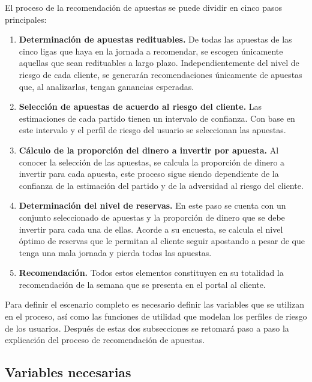  El proceso de la recomendación de apuestas se puede dividir en cinco pasos principales:

 \begin{enumerate}
 	\item \textbf{Determinación de apuestas redituables.} De todas las apuestas de las cinco ligas que haya en la jornada a recomendar, se escogen únicamente aquellas que sean redituables a largo plazo. Independientemente del nivel de riesgo de cada cliente, se generarán recomendaciones únicamente de apuestas que, al analizarlas, tengan ganancias esperadas.
 	\item \textbf{Selección de apuestas de acuerdo al riesgo del cliente.} Las estimaciones de cada partido tienen un intervalo de confianza. Con base en este intervalo y el perfil de riesgo del usuario se seleccionan las apuestas.
 	\item \textbf{Cálculo de la proporción del dinero a invertir por apuesta.} Al conocer la selección de las apuestas, se calcula la proporción de dinero a invertir para cada apuesta, este proceso sigue siendo dependiente de la confianza de la estimación del partido y de la adversidad al riesgo del cliente.
 	\item \textbf{Determinación del nivel de reservas.} En este paso se cuenta con un conjunto seleccionado de apuestas y la proporción de dinero que se debe invertir para cada una de ellas. Acorde a su encuesta, se calcula el nivel óptimo de reservas que le permitan al cliente seguir apostando a pesar de que tenga una mala jornada y pierda todas las apuestas.
 	\item \textbf{Recomendación.} Todos estos elementos constituyen en su totalidad la recomendación de la semana que se presenta en el portal al cliente.
 \end{enumerate}
 
Para definir el escenario completo es necesario definir las variables que se utilizan en el proceso, así como las funciones de utilidad que modelan los perfiles de riesgo de los usuarios. Después de estas dos subsecciones se retomará paso a paso la explicación del proceso de recomendación de apuestas.
 
\subsection{Variables necesarias}

